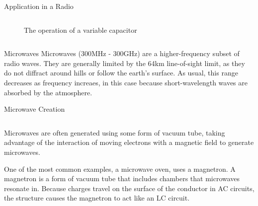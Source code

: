 \documentclass{beamer}
\begin{document}
\begin{frame}{Application in a Radio}
\begin{columns}
\begin{column}{.4\textwidth}
{\begin{figure}
	    \caption{The operation of a variable capacitor}
	    \label{fig:rotarycap}
	    \end{figure}}
	\end{column}
	\end{columns}
\end{frame}

\begin{frame}{Microwaves}
	Microwaves (300MHz - 300GHz) are a higher-frequency subset of radio waves. They are generally limited by the 64km line-of-sight limit, as they do not diffract around hills or follow the earth's surface. As usual, this range decreases as frequency increaes, in this case because short-wavelength waves are absorbed by the atmosphere.
\end{frame}

\begin{frame}{Microwave Creation}
	\begin{columns}
	\begin{column}{.6\textwidth}
    Microwaves are often generated using some form of vacuum tube, taking advantage of the interaction of moving electrons with a magnetic field to generate microwaves. \vspace{2mm}
    
    One of the most common examples, a microwave oven, uses a magnetron. A magnetron is a form of vacuum tube that includes chambers that microwaves resonate in. Because charges travel on the surface of the conductor in AC circuits, the structure causes the magnetron to act like an LC circuit.
    

\end{column}
\end{columns}
\end{frame}
\end{document}
